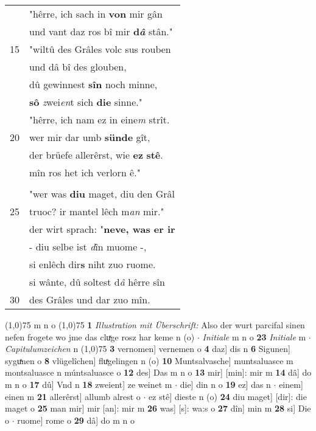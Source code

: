 \documentclass[8pt,a4paper,notitlepage]{article}
\begin{document}
\begin{table}[ht]
\begin{minipage}[t]{0.5\linewidth}
\begin{tabular}{rl}
 & "hêrre, ich sach in \textbf{von} mir gân\\ 
 & und vant daz ros bî mir \textbf{d\textit{â}} stân."\\ 
15 & "wiltû des Grâles volc sus rouben\\ 
 & und dâ bî des glouben,\\ 
 & dû gewinnest \textbf{sîn} noch minne,\\ 
 & \textbf{sô} \textit{z}wei\textit{en}t sich \textbf{die} sinne."\\ 
 & "hêrre, ich nam ez in eine\textit{m} strît.\\ 
20 & wer mir dar umb \textbf{sünde} gît,\\ 
 & der brüefe allerêrst, wie \textbf{ez} \textbf{stê}.\\ 
 & mîn ros het ich verlorn ê."\\ 
 & \textbf{\begin{large}A\end{large}ber sprach} Parcifal:\\ 
 & "wer was \textbf{diu} maget, diu den Grâl\\ 
25 & truoc? ir mantel lêch m\textit{an} mir."\\ 
 & der wirt sprach: "\textbf{neve, was er ir}\\ 
 & - diu selbe ist \textit{d}în muome -,\\ 
 & si enlêch dir\textbf{s} niht zuo ruome.\\ 
 & si wânte, dû soltest d\textit{â} hêrre sîn\\ 
30 & des Grâles und dar zuo mîn.\\ 
\end{tabular}
\scriptsize
\line(1,0){75} \newline
m n o \newline
\line(1,0){75} \newline
\textbf{1} \textit{Illustration mit Überschrift:} Also der wurt parcifal sinen nefen frogete wo jme das cluͯge rosz har keme n (o)   $\cdot$ \textit{Initiale} m n o  \textbf{23} \textit{Initiale} m   $\cdot$ \textit{Capitulumzeichen} n  \newline
\line(1,0){75} \newline
\textbf{3} vernomen] vernemen o \textbf{4} daz] dis n \textbf{6} Sigunen] syguͯnen o \textbf{8} vlügelîchen] fluͯgelingen n (o) \textbf{10} Muntsalvasche] muntsaluasce m montsaluasce n múntsaluasce o \textbf{12} des] Das m n o \textbf{13} mir] [min]: mir m \textbf{14} dâ] do m n o \textbf{17} dû] Vnd n \textbf{18} zweient] ze weinet m  $\cdot$ die] din n o \textbf{19} ez] das n  $\cdot$ einem] einen m \textbf{21} allerêrst] allumb alrest o  $\cdot$ ez stê] dieste n (o) \textbf{24} diu maget] [dir]: die maget o \textbf{25} man mir] mir [an]: mir m \textbf{26} was] [s]: wa:s o \textbf{27} dîn] min m \textbf{28} si] Die o  $\cdot$ ruome] rome o \textbf{29} dâ] do m n o \newline
\end{minipage}
\end{table}
\end{document}
